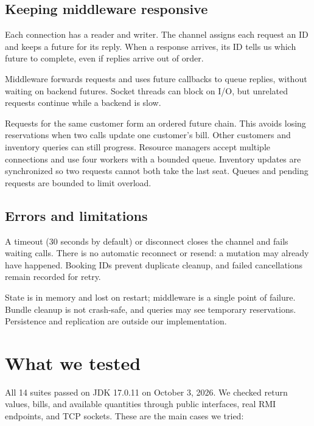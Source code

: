 \documentclass[11pt,letterpaper]{article}
\begin{document}
\subsection{Keeping middleware responsive}
Each connection has a reader and writer. The channel assigns each request an ID and
keeps a future for its reply. When a response arrives, its ID tells us which future
to complete, even if replies arrive out of order.

Middleware forwards requests and uses future callbacks to queue replies, without
waiting on backend futures. Socket threads can block on I/O, but unrelated requests
continue while a backend is slow.

Requests for the same customer form an ordered future chain. This avoids losing
reservations when two calls update one customer's bill. Other customers and inventory
queries can still progress. Resource managers accept multiple connections and use
four workers with a bounded queue. Inventory updates are synchronized so two requests
cannot both take the last seat. Queues and pending requests are bounded to limit overload.

\subsection{Errors and limitations}
A timeout (30 seconds by default) or disconnect closes the channel and fails waiting
calls. There is no automatic reconnect or resend: a mutation may already have happened.
Booking IDs prevent duplicate cleanup, and failed cancellations remain recorded for retry.

State is in memory and lost on restart; middleware is a single point of failure.
Bundle cleanup is not crash-safe, and queries may see temporary reservations.
Persistence and replication are outside our implementation.

\newpage
\section{What we tested}
All 14 suites passed on JDK 17.0.11 on October 3, 2026. We checked return values,
bills, and available quantities through public interfaces, real RMI endpoints, and
TCP sockets. These are the main cases we tried:
\end{document}
